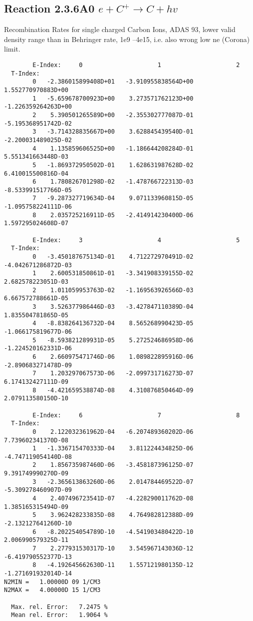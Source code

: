 \documentclass[12pt,dvipdfmx]{article}
\begin{document}
\subsection{
Reaction 2.3.6A0  $e + C^{+} \rightarrow C + hv$
}
 Recombination Rates for single
 charged Carbon Ions, ADAS 93,
 lower valid density range than in Behringer rate, 1e9 --4e15,
 i.e. also wrong low ne (Corona) limit.

\begin{small}\begin{verbatim}
        E-Index:     0                     1                     2
  T-Index:
        0   -2.386015899408D+01   -3.910955838564D+00    1.552770970883D+00
        1   -5.659678700923D+00    3.273571762123D+00   -1.226359264263D+00
        2    5.390501265589D+00   -2.355302777087D-01   -5.195368951742D-02
        3   -3.714328835667D+00    3.628845439540D-01   -2.200031489025D-02
        4    1.135859606525D+00   -1.186644208284D-01    5.551341663448D-03
        5   -1.869372950502D-01    1.628631987628D-02    6.410015500816D-04
        6    1.780826701298D-02   -1.478766722313D-03   -8.533991517766D-05
        7   -9.287327719634D-04    9.071133960815D-05   -1.095758224111D-06
        8    2.035725216911D-05   -2.414914230400D-06    1.597295024608D-07

        E-Index:     3                     4                     5
  T-Index:
        0   -3.450187675134D-01    4.712272970491D-02   -4.042671286872D-03
        1    2.600531850861D-01   -3.341908339155D-02    2.682578223051D-03
        2    1.011059953763D-02   -1.169563926566D-03    6.667572788661D-05
        3    3.526377986446D-03   -3.427847110389D-04    1.835504781865D-05
        4   -8.838264136732D-04    8.565268990423D-05   -1.066175819677D-06
        5   -8.593821289931D-05    5.272524686958D-06   -1.224520162331D-06
        6    2.660975471746D-06    1.089822895916D-06   -2.890683271478D-09
        7    1.203297067573D-06   -2.099731716273D-07    6.174132427111D-09
        8   -4.421659538874D-08    4.310876850464D-09    2.079113580150D-10

        E-Index:     6                     7                     8
  T-Index:
        0    2.122032361962D-04   -6.207489360202D-06    7.739602341370D-08
        1   -1.336715470333D-04    3.811224434825D-06   -4.747119054140D-08
        2    1.856735987460D-06   -3.458187396125D-07    9.391749990270D-09
        3   -2.365613863260D-06    2.014784469522D-07   -5.309278460907D-09
        4    2.407496723541D-07   -4.228290011762D-08    1.385165315494D-09
        5    3.962428233835D-08    4.764982812388D-09   -2.132127641260D-10
        6   -8.202254054789D-10   -4.541903480422D-10    2.006990579325D-11
        7    2.277931530317D-10    3.545967143036D-12   -6.419790552377D-13
        8   -4.192645662630D-11    1.557121980135D-12   -1.271691932014D-14
N2MIN =   1.00000D 09 1/CM3
N2MAX =   4.00000D 15 1/CM3

  Max. rel. Error:   7.2475 %
  Mean rel. Error:   1.9064 %


\end{verbatim}\end{small}
\end{document}
